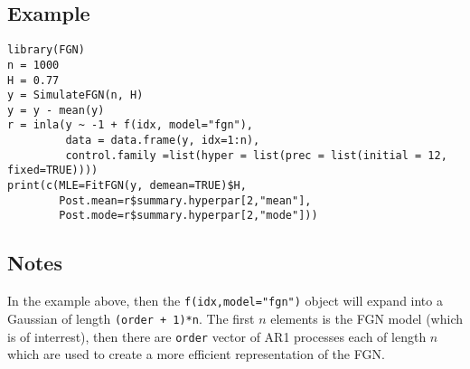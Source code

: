 \documentclass[a4paper,11pt]{article}
\begin{document}
\subsection*{Example}

\begin{verbatim}
library(FGN)
n = 1000
H = 0.77
y = SimulateFGN(n, H)
y = y - mean(y)
r = inla(y ~ -1 + f(idx, model="fgn"), 
         data = data.frame(y, idx=1:n),
         control.family =list(hyper = list(prec = list(initial = 12, fixed=TRUE))))
print(c(MLE=FitFGN(y, demean=TRUE)$H,
        Post.mean=r$summary.hyperpar[2,"mean"],
        Post.mode=r$summary.hyperpar[2,"mode"]))
\end{verbatim}


\subsection*{Notes}

In the example above, then the \texttt{f(idx,model="fgn")} object will
expand into a Gaussian of length \texttt{(order + 1)*n}. The first $n$
elements is the FGN model (which is of interrest), then there are
\texttt{order} vector of AR1 processes each of length $n$ which are
used to create a more efficient representation of the FGN.
\end{document}
